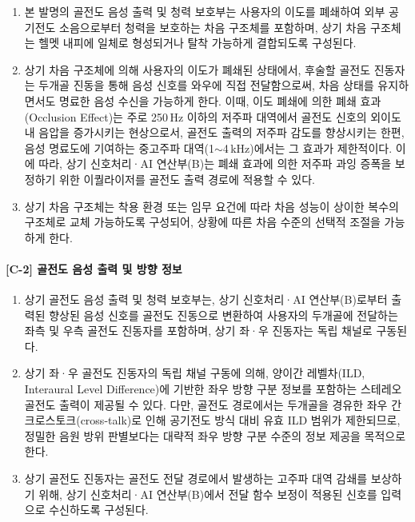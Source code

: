 \documentclass{article}
\begin{document}
\begin{enumerate}[label = \textbf{(C.1.\arabic*)}]

    \item 본 발명의 골전도 음성 출력 및 청력 보호부는 사용자의 이도를 폐쇄하여 외부 공기전도 소음으로부터 청력을 보호하는 차음 구조체를 포함하며, 상기 차음 구조체는 헬멧 내피에 일체로 형성되거나 탈착 가능하게 결합되도록 구성된다.

    \item 상기 차음 구조체에 의해 사용자의 이도가 폐쇄된 상태에서, 후술할 골전도 진동자는 두개골 진동을 통해 음성 신호를 와우에 직접 전달함으로써, 차음 상태를 유지하면서도 명료한 음성 수신을 가능하게 한다. 이때, 이도 폐쇄에 의한 폐쇄 효과(Occlusion Effect)는 주로 250\,Hz 이하의 저주파 대역에서 골전도 신호의 외이도 내 음압을 증가시키는 현상으로서, 골전도 출력의 저주파 감도를 향상시키는 한편, 음성 명료도에 기여하는 중고주파 대역(1$\sim$4\,kHz)에서는 그 효과가 제한적이다. 이에 따라, 상기 신호처리·AI 연산부(B)는 폐쇄 효과에 의한 저주파 과잉 증폭을 보정하기 위한 이퀄라이저를 골전도 출력 경로에 적용할 수 있다.

    \item 상기 차음 구조체는 착용 환경 또는 임무 요건에 따라 차음 성능이 상이한 복수의 구조체로 교체 가능하도록 구성되어, 상황에 따른 차음 수준의 선택적 조절을 가능하게 한다.
\end{enumerate}


\paragraph{[C-2] 골전도 음성 출력 및 방향 정보}

\begin{enumerate}[label = \textbf{(C.2.\arabic*)}]

    \item 상기 골전도 음성 출력 및 청력 보호부는, 상기 신호처리·AI 연산부(B)로부터 출력된 향상된 음성 신호를 골전도 진동으로 변환하여 사용자의 두개골에 전달하는 좌측 및 우측 골전도 진동자를 포함하며, 상기 좌·우 진동자는 독립 채널로 구동된다.

    \item 상기 좌·우 골전도 진동자의 독립 채널 구동에 의해, 양이간 레벨차(ILD, Interaural Level Difference)에 기반한 좌우 방향 구분 정보를 포함하는 스테레오 골전도 출력이 제공될 수 있다. 다만, 골전도 경로에서는 두개골을 경유한 좌우 간 크로스토크(cross-talk)로 인해 공기전도 방식 대비 유효 ILD 범위가 제한되므로, 정밀한 음원 방위 판별보다는 대략적 좌우 방향 구분 수준의 정보 제공을 목적으로 한다.

    \item 상기 골전도 진동자는 골전도 전달 경로에서 발생하는 고주파 대역 감쇄를 보상하기 위해, 상기 신호처리·AI 연산부(B)에서 전달 함수 보정이 적용된 신호를 입력으로
    수신하도록 구성된다.

\end{enumerate}
\end{document}
